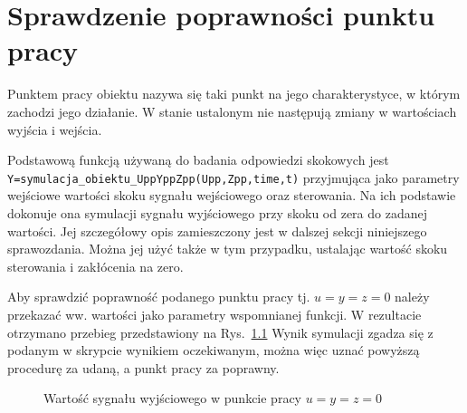 \chapter{Sprawdzenie poprawności punktu pracy}
Punktem pracy obiektu nazywa się taki punkt na jego charakterystyce, w którym zachodzi jego działanie. W stanie ustalonym nie następują zmiany w wartościach wyjścia i wejścia.

Podstawową funkcją używaną do badania odpowiedzi skokowych jest \verb+Y=symulacja_obiektu_UppYppZpp(Upp,Zpp,time,t)+ przyjmująca jako parametry wejściowe wartości skoku sygnału wejściowego oraz sterowania. Na ich podstawie dokonuje ona symulacji sygnału wyjściowego przy skoku od zera do zadanej wartości. Jej szczegółowy opis zamieszczony jest w dalszej sekcji niniejszego sprawozdania. Można jej użyć także w tym przypadku, ustalając wartość skoku sterowania i zakłócenia na zero.

Aby sprawdzić poprawność podanego punktu pracy tj. $u=y=z=0$ należy przekazać ww. wartości jako parametry wspomnianej funkcji. W rezultacie otrzymano przebieg przedstawiony na Rys.~\ref{ppracy} Wynik symulacji zgadza się z podanym w skrypcie wynikiem oczekiwanym, można więc uznać powyższą procedurę za udaną, a punkt pracy za poprawny.

\begin{figure}
	\centering
	\caption{Wartość sygnału wyjściowego w punkcie pracy $u=y=z=0$}
	
	\label{ppracy}
\end{figure}